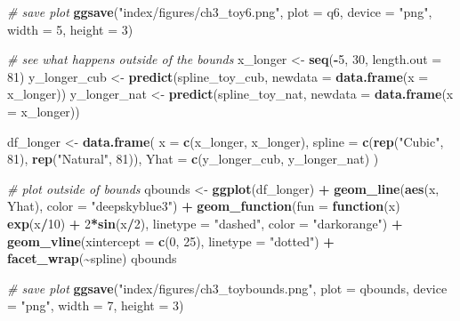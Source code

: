 \documentclass[12pt, twoside]{amherstthesis}
\newenvironment{Shaded}{\begin{snugshade}}{\end{snugshade}}
\newcommand{\AttributeTok}[1]{\textcolor[rgb]{0.13,0.29,0.53}{#1}}
\newcommand{\CommentTok}[1]{\textcolor[rgb]{0.56,0.35,0.01}{\textit{#1}}}
\newcommand{\ControlFlowTok}[1]{\textcolor[rgb]{0.13,0.29,0.53}{\textbf{#1}}}
\newcommand{\DecValTok}[1]{\textcolor[rgb]{0.00,0.00,0.81}{#1}}
\newcommand{\FunctionTok}[1]{\textcolor[rgb]{0.13,0.29,0.53}{\textbf{#1}}}
\newcommand{\NormalTok}[1]{#1}
\newcommand{\OtherTok}[1]{\textcolor[rgb]{0.56,0.35,0.01}{#1}}
\newcommand{\SpecialCharTok}[1]{\textcolor[rgb]{0.81,0.36,0.00}{\textbf{#1}}}
\newcommand{\StringTok}[1]{\textcolor[rgb]{0.31,0.60,0.02}{#1}}
\begin{document}
\begin{Shaded}
\begin{Highlighting}[]
\CommentTok{\# save plot}
\FunctionTok{ggsave}\NormalTok{(}\StringTok{"index/figures/ch3\_toy6.png"}\NormalTok{, }\AttributeTok{plot =}\NormalTok{ q6, }\AttributeTok{device =} \StringTok{"png"}\NormalTok{, }
       \AttributeTok{width =} \DecValTok{5}\NormalTok{, }\AttributeTok{height =} \DecValTok{3}\NormalTok{)}

\CommentTok{\# see what happens outside of the bounds}
\NormalTok{x\_longer }\OtherTok{\textless{}{-}} \FunctionTok{seq}\NormalTok{(}\SpecialCharTok{{-}}\DecValTok{5}\NormalTok{, }\DecValTok{30}\NormalTok{, }\AttributeTok{length.out =} \DecValTok{81}\NormalTok{)}
\NormalTok{y\_longer\_cub }\OtherTok{\textless{}{-}} \FunctionTok{predict}\NormalTok{(spline\_toy\_cub, }
                        \AttributeTok{newdata =} \FunctionTok{data.frame}\NormalTok{(}\AttributeTok{x =}\NormalTok{ x\_longer))}
\NormalTok{y\_longer\_nat }\OtherTok{\textless{}{-}} \FunctionTok{predict}\NormalTok{(spline\_toy\_nat, }
                        \AttributeTok{newdata =} \FunctionTok{data.frame}\NormalTok{(}\AttributeTok{x =}\NormalTok{ x\_longer))}

\NormalTok{df\_longer }\OtherTok{\textless{}{-}} \FunctionTok{data.frame}\NormalTok{(}
  \AttributeTok{x =} \FunctionTok{c}\NormalTok{(x\_longer, x\_longer), }
  \AttributeTok{spline =} \FunctionTok{c}\NormalTok{(}\FunctionTok{rep}\NormalTok{(}\StringTok{"Cubic"}\NormalTok{, }\DecValTok{81}\NormalTok{), }\FunctionTok{rep}\NormalTok{(}\StringTok{"Natural"}\NormalTok{, }\DecValTok{81}\NormalTok{)), }
  \AttributeTok{Yhat =} \FunctionTok{c}\NormalTok{(y\_longer\_cub, y\_longer\_nat)}
\NormalTok{)}

\CommentTok{\# plot outside of bounds}
\NormalTok{qbounds }\OtherTok{\textless{}{-}} \FunctionTok{ggplot}\NormalTok{(df\_longer) }\SpecialCharTok{+} 
  \FunctionTok{geom\_line}\NormalTok{(}\FunctionTok{aes}\NormalTok{(x, Yhat), }\AttributeTok{color =} \StringTok{"deepskyblue3"}\NormalTok{) }\SpecialCharTok{+}
  \FunctionTok{geom\_function}\NormalTok{(}\AttributeTok{fun =} \ControlFlowTok{function}\NormalTok{(x) }\FunctionTok{exp}\NormalTok{(x}\SpecialCharTok{/}\DecValTok{10}\NormalTok{) }\SpecialCharTok{+} \DecValTok{2}\SpecialCharTok{*}\FunctionTok{sin}\NormalTok{(x}\SpecialCharTok{/}\DecValTok{2}\NormalTok{), }
                \AttributeTok{linetype =} \StringTok{"dashed"}\NormalTok{, }\AttributeTok{color =} \StringTok{"darkorange"}\NormalTok{) }\SpecialCharTok{+}
  \FunctionTok{geom\_vline}\NormalTok{(}\AttributeTok{xintercept =} \FunctionTok{c}\NormalTok{(}\DecValTok{0}\NormalTok{, }\DecValTok{25}\NormalTok{), }\AttributeTok{linetype =} \StringTok{"dotted"}\NormalTok{) }\SpecialCharTok{+}
  \FunctionTok{facet\_wrap}\NormalTok{(}\SpecialCharTok{\textasciitilde{}}\NormalTok{spline) }
\NormalTok{qbounds}

\CommentTok{\# save plot}
\FunctionTok{ggsave}\NormalTok{(}\StringTok{"index/figures/ch3\_toybounds.png"}\NormalTok{, }\AttributeTok{plot =}\NormalTok{ qbounds, }
       \AttributeTok{device =} \StringTok{"png"}\NormalTok{, }\AttributeTok{width =} \DecValTok{7}\NormalTok{, }\AttributeTok{height =} \DecValTok{3}\NormalTok{)}
\end{Highlighting}
\end{Shaded}
\end{document}
